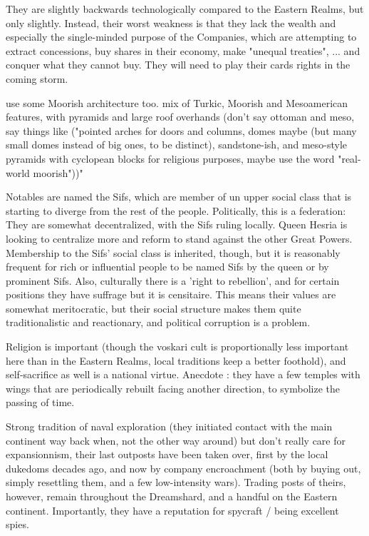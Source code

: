 They are slightly backwards technologically compared to the Eastern Realms, but only slightly. Instead, their worst weakness is that they lack the wealth and especially the single-minded purpose of the Companies, which are attempting to extract concessions, buy shares in their economy, make "unequal treaties", ... and conquer what they cannot buy. They will need to play their cards rights in the coming storm. 

use some Moorish architecture too. mix of Turkic, Moorish and Mesoamerican features, with pyramids and large roof overhands (don't say ottoman and meso, say things like ("pointed arches for doors and columns, domes maybe (but many small domes instead of big ones, to be distinct), sandstone-ish, and meso-style pyramids with cyclopean blocks for religious purposes, maybe use the word "real-world moorish"))"

Notables are named the Sifs, which are member of un upper social class that is starting to diverge from the rest of the people. Politically, this is a federation: They are somewhat decentralized, with the Sifs ruling locally. Queen Hesria is looking to centralize more and reform to stand against the other Great Powers. Membership to the Sifs' social class is inherited, though, but it is reasonably frequent for rich or influential people to be named Sifs by the queen or by prominent Sifs. Also, culturally there is a 'right to rebellion', and for certain positions they have suffrage but it is censitaire. This means their values are somewhat meritocratic, but their social structure makes them quite traditionalistic and reactionary, and political corruption is a problem.

Religion is important (though the voskari cult is proportionally less important here than in the Eastern Realms, local traditions keep a better foothold), and self-sacrifice as well is a national virtue. Anecdote : they have a few temples with wings that are periodically rebuilt facing another direction, to symbolize the passing of time.

Strong tradition of naval exploration (they initiated contact with the main continent way back when, not the other way around) but don't really care for expansionnism, their last outposts have been taken over, first by the local dukedoms decades ago, and now by company encroachment (both by buying out, simply resettling them, and a few low-intensity wars). Trading posts of theirs, however, remain throughout the Dreamshard, and a handful on the Eastern continent. Importantly, they have a reputation for spycraft / being excellent spies.



